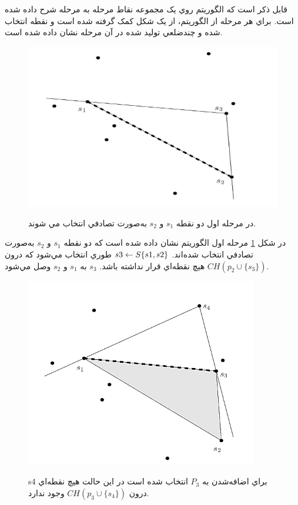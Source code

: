\documentclass{book}
\begin{document}
قابل ذکر است که الگوريتم روي يک مجموعه نقاط مرحله به مرحله شرح داده شده است. براي هر مرحله از الگوريتم، از يک شکل کمک گرفته شده است و نقطه‌ انتخاب شده و چندضلعي توليد شده در آن مرحله نشان داده شده است. 

\begin{figure}[h!]
    \begin{center}
        \includegraphics[width=\linewidth]{simp1.png}
        \label{simp1}
        \caption{در مرحله اول دو نقطه $s_1$ و $s_2$ به‌صورت تصادفي انتخاب مي شوند.}
    \end{center}
\end{figure}


در شکل \ref{simp1} مرحله اول الگوريتم نشان داده شده است که دو نقطه $s_1$ و $s_2$ به‌صورت تصادفي انتخاب شده‌اند.
$s3 \leftarrow S\\\{s1,s2\}$   طوري انتخاب مي‌شود که درون $CH(p_2 \cup \{s_3\})$ هيچ نقطه‌اي قرار نداشته باشد. $s_3$ به $s_1$ و $s_2$ وصل مي‌شود. 

\begin{figure}[h!]
    \begin{center}
        \includegraphics[width=\linewidth]{simp2.png}
        \label{simp2}
        \caption{s4 براي اضافه‌شدن به $P_3$ انتخاب‌ شده است در اين حالت هيچ نقطه‌اي درون $CH(p_3 \cup \{s_4\})$ وجود ندارد.}
    \end{center}
\end{figure}
\end{document}
